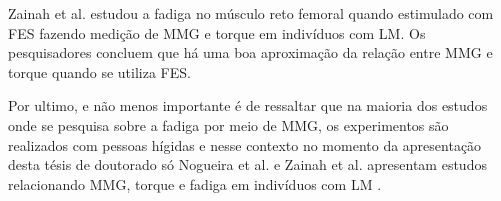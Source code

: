 Zainah et al. estudou a fadiga no músculo reto femoral quando estimulado com \acrshort{FES} fazendo medição de \acrshort{MMG} e torque em indivíduos com \acrshort{LM}. Os pesquisadores concluem que há uma boa aproximação da relação entre \acrshort{MMG} e torque quando se utiliza \acrshort{FES}. 

Por ultimo, e não menos importante é de ressaltar que na maioria dos estudos onde se pesquisa sobre a fadiga por meio de \acrshort{MMG}, os experimentos são realizados com pessoas hígidas e nesse contexto no momento da apresentação desta tésis de doutorado só Nogueira et al. e Zainah et al. apresentam estudos relacionando \acrshort{MMG}, torque e fadiga em indivíduos com \acrshort{LM} \cite{ Zainah2017, NogueiraNeto2013}.



